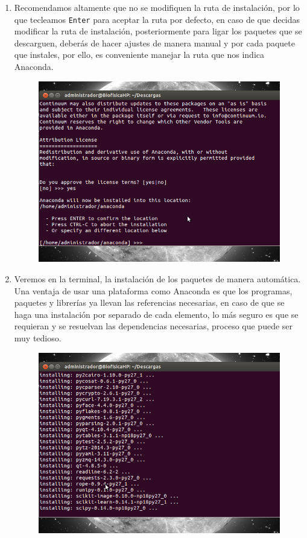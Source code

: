 \documentclass[12pt]{article}
\begin{document}
\begin{enumerate}
\begin{figure}[H]
\end{figure}
\item Recomendamos altamente que no se modifiquen la ruta de instalación, por lo que tecleamos \texttt{Enter} para aceptar la ruta por defecto, en caso de que decidas modificar la ruta de instalación, posteriormente para ligar los paquetes que se descarguen, deberás de hacer ajustes de manera manual y por cada paquete que instales, por ello, es conveniente manejar la ruta que nos indica Anaconda.
\begin{figure}[H]
	\centering
	\includegraphics[scale=0.5]{Imagenes/Anaconda_Linux_05.png} 
\end{figure}
\item Veremos en la terminal, la instalación de los paquetes de manera automática. Una ventaja de usar una plataforma como Anaconda es que los programas, paquetes y librerías ya llevan las referencias necesarias, en caso de que se haga una instalación por separado de cada elemento, lo más seguro es que se requieran y se resuelvan las dependencias necesarias, proceso que puede ser muy tedioso.
\begin{figure}[H]
	\centering
	\includegraphics[scale=0.5]{Imagenes/Anaconda_Linux_06.png} 

\end{figure}
\end{enumerate}
\end{document}
